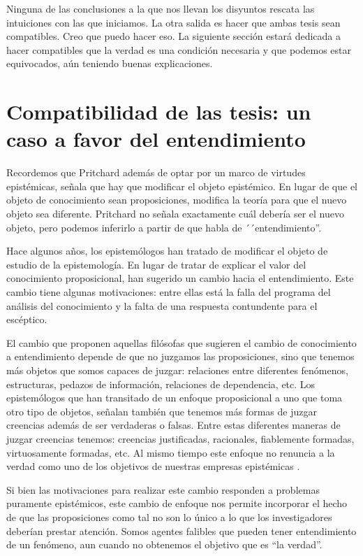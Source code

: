 \documentclass{article}
\begin{document}
Ninguna de las conclusiones a la que nos llevan los disyuntos rescata las intuiciones con las que iniciamos. La otra salida es hacer que ambas tesis sean compatibles. Creo que puedo hacer eso. La siguiente sección estará dedicada a hacer compatibles que la verdad es una condición necesaria y que podemos estar equivocados, aún teniendo buenas explicaciones.

\section{Compatibilidad de las tesis: un caso a favor del entendimiento}

\noindent Recordemos que Pritchard además de optar por un marco de virtudes epistémicas, señala que hay que modificar el objeto epistémico. En lugar de que el objeto de conocimiento sean proposiciones, modifica la teoría para que el nuevo objeto sea diferente. Pritchard no señala exactamente cuál debería ser el nuevo objeto, pero podemos inferirlo a partir de que habla de ´´entendimiento''. 

Hace algunos años, los epistemólogos han tratado de modificar el objeto de estudio de la epistemología. En lugar de tratar de explicar el valor del conocimiento proposicional, han sugerido un cambio hacia el entendimiento. Este cambio tiene algunas motivaciones: entre ellas está la falla del programa del análisis del conocimiento y la falta de una respuesta contundente para el escéptico. 

El cambio que proponen aquellas filósofas que sugieren el cambio de conocimiento a entendimiento depende de que no juzgamos las proposiciones, sino que tenemos más objetos que somos capaces de juzgar: relaciones entre diferentes fenómenos, estructuras, pedazos de información, relaciones de dependencia, etc. Los epistemólogos que han transitado de un enfoque proposicional a uno que toma otro tipo de objetos, señalan también que tenemos más formas de juzgar creencias además de ser verdaderas o falsas. Entre estas diferentes maneras de juzgar creencias tenemos: creencias justificadas, racionales, fiablemente formadas, virtuosamente formadas, etc. Al mismo tiempo este enfoque no renuncia a la verdad como uno de los objetivos de nuestras empresas epistémicas \cite{Grimm2012-GRITVO-4}.

Si bien las motivaciones para realizar este cambio responden a problemas puramente epistémicos, este cambio de enfoque nos permite incorporar el hecho de que las proposiciones como tal no son lo único a lo que los investigadores deberían prestar atención. Somos agentes falibles que pueden tener entendimiento de un fenómeno, aun cuando no obtenemos el objetivo que es ``la verdad''.
\end{document}
